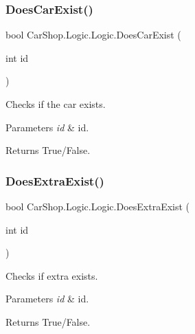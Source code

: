 \subsubsection{\texorpdfstring{Does\+Car\+Exist()}{DoesCarExist()}}
{\footnotesize\ttfamily bool Car\+Shop.\+Logic.\+Logic.\+Does\+Car\+Exist (\begin{DoxyParamCaption}\item[{int}]{id }\end{DoxyParamCaption})}



Checks if the car exists. 


\begin{DoxyParams}{Parameters}
{\em id} & id.\\
\hline
\end{DoxyParams}
\begin{DoxyReturn}{Returns}
True/\+False.
\end{DoxyReturn}
\mbox{\label{class_car_shop_1_1_logic_1_1_logic_aef83ecf9811ba2af99936d03ab95ddb9}} 
\subsubsection{\texorpdfstring{Does\+Extra\+Exist()}{DoesExtraExist()}}
{\footnotesize\ttfamily bool Car\+Shop.\+Logic.\+Logic.\+Does\+Extra\+Exist (\begin{DoxyParamCaption}\item[{int}]{id }\end{DoxyParamCaption})}



Checks if extra exists. 


\begin{DoxyParams}{Parameters}
{\em id} & id.\\
\hline
\end{DoxyParams}
\begin{DoxyReturn}{Returns}
True/\+False.
\end{DoxyReturn}
\mbox{\label{class_car_shop_1_1_logic_1_1_logic_a91f3a4a292e1869a5bdb917dd2378435}} 
